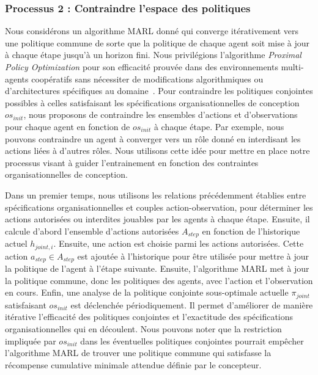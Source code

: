 \documentclass[contribution]{jfsma}
\newcounter{relation}
\begin{document}
\subsubsection{Processus 2 : Contraindre l'espace des politiques}

Nous considérons un algorithme MARL donné qui converge itérativement vers une politique commune de sorte que la politique de chaque agent soit mise à jour à chaque étape jusqu'à un horizon fini.
Nous privilégions l'algorithme \emph{Proximal Policy Optimization} pour son efficacité prouvée dans des environnements multi-agents coopératifs sans nécessiter de modifications algorithmiques ou d'architectures spécifiques au domaine~\cite{Yu2022}.
Pour contraindre les politiques conjointes possibles à celles satisfaisant les spécifications organisationnelles de conception $os_{init}$, nous proposons de contraindre les ensembles d'actions et d'observations pour chaque agent en fonction de $os_{init}$ à chaque étape. Par exemple, nous pouvons contraindre un agent à converger vers un rôle donné en interdisant les actions liées à d’autres rôles. Nous utilisons cette idée pour mettre en place notre processus visant à guider l'entrainement en fonction des contraintes organisationnelles de conception.

Dans un premier temps, nous utilisons les relations précédemment établies entre spécifications organisationnelles et couples action-observation, pour déterminer les actions autorisées ou interdites jouables par les agents à chaque étape.
Ensuite, il calcule d'abord l'ensemble d'actions autorisées $A_{step}$ en fonction de l'historique actuel $h_{joint,i}$. Ensuite, une action est choisie parmi les actions autorisées. Cette action $a_{step} \in A_{step}$ est ajoutée à l'historique pour être utilisée pour mettre à jour la politique de l'agent à l'étape suivante. Ensuite, l'algorithme MARL met à jour la politique commune, donc les politiques des agents, avec l'action et l'observation en cours.
Enfin, une analyse de la politique conjointe sous-optimale actuelle $\pi_{joint}$ satisfaisant $os_{init}$ est déclenchée périodiquement. Il permet d’améliorer de manière itérative l’efficacité des politiques conjointes et l’exactitude des spécifications organisationnelles qui en découlent.
Nous pouvons noter que la restriction impliquée par $os_{init}$ dans les éventuelles politiques conjointes pourrait empêcher l'algorithme MARL de trouver une politique commune qui satisfasse la récompense cumulative minimale attendue définie par le concepteur.
\end{document}
